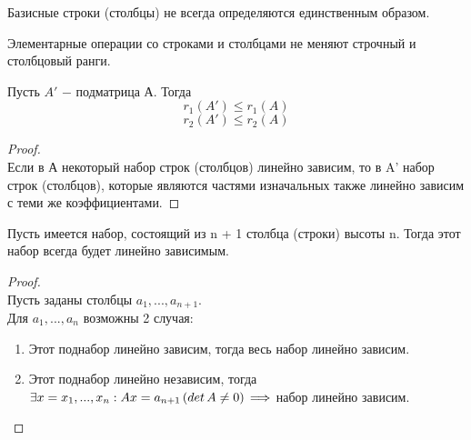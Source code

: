 \begin{note}
    Базисные строки (столбцы) не всегда определяются единственным образом.
\end{note}

\begin{proposition}
    Элементарные операции со строками и столбцами не меняют строчный и столбцовый ранги.
\end{proposition}

\begin{proposition}
    Пусть $A'$ $-$ подматрица А. Тогда
    \[
    r_1(A') \leq r_1(A)
    \]
    \[
    r_2(A') \leq r_2(A)
    \]
\end{proposition}
\begin{proof}
    \tab\\
    
    Если в А некоторый набор строк (столбцов) линейно зависим, то в A' набор строк (столбцов), которые являются частями изначальных также линейно зависим с теми же коэффициентами.
\end{proof}

\begin{theorem}
    Пусть имеется набор, состоящий из n + 1 столбца (строки) высоты n. Тогда этот набор всегда будет линейно зависимым.
\end{theorem}
\begin{proof}
    \tab\\

    Пусть заданы столбцы $a_1, ..., a_{n + 1}$.\\

    Для $a_1, ..., a_n$ возможны 2 случая:
    \begin{enumerate}
        \item Этот поднабор линейно зависим, тогда весь набор линейно зависим.
        \item Этот поднабор линейно независим, тогда $\exists x = x_1, ..., x_n : Ax = a_{n + 1}\thinspace (det\thinspace A \neq 0)\thinspace \Longrightarrow$ набор линейно зависим.
    \end{enumerate}
\end{proof}

